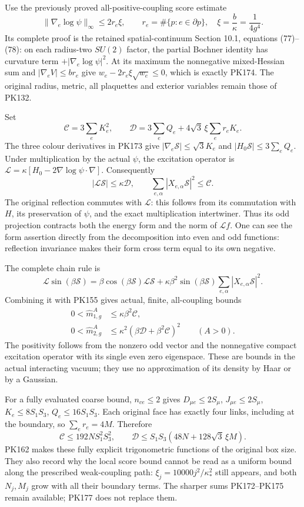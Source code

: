 \documentclass[11pt]{article}
\begin{document}
Use the previously proved all-positive-coupling score estimate
\[
 \|\nabla_e\log\psi\|_\infty\le2r_e\xi,\qquad
 r_e=\#\{p:e\in\partial p\},\quad
 \xi=\frac b\kappa=\frac1{4g^4}.
 \tag{PK174}
\]
Its complete proof is the retained spatial-continuum Section 10.1,
equations (77)–(78): on each radius-two \(SU(2)\) factor, the partial
Bochner identity has curvature term \(+|\nabla_e\log\psi|^2\).
At its maximum the nonnegative mixed-Hessian sum and
\(|\nabla_eV|\le br_e\) give
\(w_e-2r_e\xi\sqrt{w_e}\le0\), which is exactly PK174.
The original radius, metric, all plaquettes and exterior variables
remain those of PK132.

Set
\[
 \mathcal C=3\sum_eK_e^2,\qquad
 \mathcal D=3\sum_eQ_e+4\sqrt3\,\xi\sum_er_eK_e .
 \tag{PK175}
\]
The three colour derivatives in PK173 give
\(|\nabla_e\mathcal S|\le\sqrt3K_e\) and
\(|H_0\mathcal S|\le3\sum_eQ_e\).
Under multiplication by the actual \(\psi\), the excitation operator is
\(\mathscr L=\kappa[H_0-2\nabla\log\psi\cdot\nabla]\).
Consequently
\[
 |\mathscr L\mathcal S|\le\kappa\mathcal D,\qquad
 \sum_{e,\alpha}|X_{e,\alpha}\mathcal S|^2\le\mathcal C.
\]
The original reflection commutes with \(\mathscr L\): this follows
from its commutation with \(H\), its preservation of \(\psi\),
and the exact multiplication intertwiner. Thus its odd projection
contracts both the energy form and the norm of \(\mathscr L f\).
One can see the form assertion directly from the decomposition
into even and odd functions: reflection invariance makes their form
cross term equal to its own negative.

The complete chain rule is
\[
 \mathscr L\sin(\beta\mathcal S)
 =\beta\cos(\beta\mathcal S)\mathscr L\mathcal S
   +\kappa\beta^2\sin(\beta\mathcal S)
                \sum_{e,\alpha}|X_{e,\alpha}\mathcal S|^2 .
\]
Combining it with PK155 gives actual, finite, all-coupling bounds
\[
 \begin{split}
 0<\widehat m_{1,g}^A&\le\kappa\beta^2\mathcal C,\\
 0<\widehat m_{2,g}^A&\le
                \kappa^2(\beta\mathcal D+\beta^2\mathcal C)^2
                       \qquad(A>0).
 \end{split}\tag{PK176}
\]
The positivity follows from the nonzero odd vector and the
nonnegative compact excitation operator with its single even
zero eigenspace. These are bounds in the actual interacting vacuum;
they use no approximation of its density by Haar or by a Gaussian.

For a fully evaluated coarse bound, \(n_{ce}\le2\) gives
\(D_{\mu e}\le2S_\mu\), \(J_{\mu e}\le2S_\mu\),
\(K_e\le8S_1S_3\), \(Q_e\le16S_1S_3\).
Each original face has exactly four links, including at the boundary,
so \(\sum_er_e=4M\). Therefore
\[
 \mathcal C\le192N S_1^2S_3^2,\qquad
 \mathcal D\le S_1S_3(48N+128\sqrt3\,\xi M).
 \tag{PK177}
\]
PK162 makes these fully explicit trigonometric functions of the
original box size. They also record why the local score bound cannot
be read as a uniform bound along the prescribed weak-coupling path:
\(\xi_j=10000j^2/\kappa_*^2\) still appears, and both \(N_j,M_j\)
grow with all their boundary terms. The sharper sums PK172–PK175
remain available; PK177 does not replace them.
\end{document}
